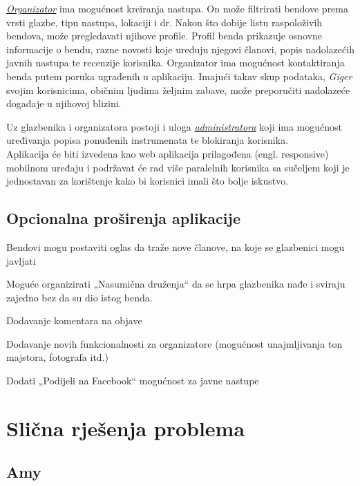 		\textit{\underline{Organizator}} ima mogućnost kreiranja nastupa. On može filtrirati bendove prema vrsti glazbe, tipu nastupa, lokaciji i dr. Nakon što dobije listu raspoloživih bendova, može pregledavati njihove profile. Profil benda prikazuje osnovne informacije o bendu, razne novosti koje uređuju njegovi članovi, popis nadolazećih javnih nastupa te recenzije korisnika. Organizator ima mogućnost kontaktiranja benda putem poruka ugrađenih u aplikaciju. Imajući takav skup podataka, \textit{Giger} svojim korisnicima, običnim ljudima željnim zabave, može preporučiti nadolazeće događaje u njihovoj blizini.
		
		Uz glazbenika i organizatora postoji i uloga \textit{\underline{administratora}} koji ima mogućnost uređivanja popisa ponuđenih instrumenata te blokiranja korisnika.
		\\
		
		Aplikacija će biti izvedena kao web aplikacija prilagođena (engl. responsive) mobilnom uređaju i podržavat će rad više paralelnih korisnika sa sučeljem koji je jednostavan za korištenje kako bi korisnici imali što bolje iskustvo.
		
		\subsection{Opcionalna proširenja aplikacije}
		
		\begin{packed_item}
			\item Bendovi mogu postaviti oglas da traže nove članove, na koje se glazbenici mogu javljati
			\item Moguće organizirati „Nasumična druženja“ da se hrpa glazbenika nađe i sviraju zajedno bez da su dio istog benda.
			\item Dodavanje komentara na objave
			\item Dodavanje novih funkcionalnosti za organizatore (mogućnost unajmljivanja ton majstora, fotografa itd.)
			\item Dodati „Podijeli na Facebook“ mogućnost za javne nastupe
		\end{packed_item}
		
		
		
		\section{Slična rješenja problema}
		
		\subsection{Amy}
		
